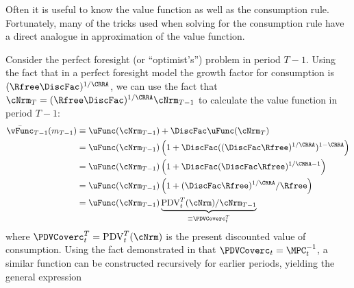 
  Often it is useful to know the value function as well as the consumption rule.  Fortunately, many of the tricks used when solving for the consumption rule have a direct analogue in approximation of the value function.

  Consider the perfect foresight (or ``optimist's'') problem in period $T-1$.  Using the fact that in a perfect foresight model the growth factor for consumption is $(\Rfree \DiscFac)^{1/\CRRA}$, we can use the fact that $\cNrm_{T} = (\Rfree \DiscFac)^{1/\CRRA} \cNrm_{T-1}$ to calculate the value function in period $T-1$:
  \begin{equation*}\begin{gathered}\begin{aligned}
        \bar{\vFunc}_{T-1}({m}_{T-1})  & \equiv  \uFunc(\cNrm_{T-1})+\DiscFac \uFunc(\cNrm_{T})
        \\  & = \uFunc(\cNrm_{T-1})\left(1+\DiscFac ((\DiscFac\Rfree)^{1/\CRRA})^{1-\CRRA}\right)
        \\  & = \uFunc(\cNrm_{T-1})\left(1+\DiscFac (\DiscFac\Rfree)^{1/\CRRA-1}\right)
        \\  & = \uFunc(\cNrm_{T-1})\left(1+(\DiscFac\Rfree)^{1/\CRRA}/\Rfree\right)
        \\  & = \uFunc(\cNrm_{T-1})\underbrace{\mbox{PDV}_{t}^{T}(\cNrm)/\cNrm_{T-1}}_{\equiv \PDVCoverc_{t}^{T}}
      \end{aligned}\end{gathered}\end{equation*}
  where $\PDVCoverc_{t}^{T}=\mbox{PDV}_{t}^{T}(\cNrm)$ is the present discounted value of consumption. Using the fact demonstrated in \cite{BufferStockTheory} that $\PDVCoverc_{t}=\MPC^{-1}_{t}$, a similar function can be constructed recursively for earlier periods, yielding the general expression \hypertarget{vFuncPF}{}
